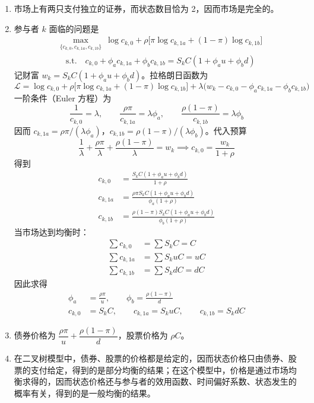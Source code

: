 \begin{solution}
\begin{enumerate}[label=(\alph*)]
    \item 市场上有两只支付独立的证券，而状态数目恰为 2，因而市场是完全的。
    \item 参与者 $k$ 面临的问题是
    \[
        \begin{aligned}
            &\max_{\{c_{k,0},c_{k,1a},c_{k,1b}\}}\ \log c_{k,0}+\rho\bigl[\pi\log c_{k,1a}+(1-\pi)\log c_{k,1b}\bigr]\\
            &\quad\text{s.t.}\quad c_{k,0}+\phi_{a}c_{k,1a}+\phi_{b}c_{k,1b}=S_{k}C(1+\phi_{a}u+\phi_{b}d)
        \end{aligned}
    \]
    记财富 $w_{k}=S_{k}C(1+\phi_{a}u+\phi_{b}d)$。拉格朗日函数为
    \[
        \mathcal{L}=\log c_{k,0}+\rho\bigl[\pi\log c_{k,1a}+(1-\pi)\log c_{k,1b}\bigr]+\lambda\bigl(w_{k}-c_{k,0}-\phi_{a}c_{k,1a}-\phi_{b}c_{k,1b}\bigr)
    \]
    一阶条件（Euler 方程）为
    \[
        \frac{1}{c_{k,0}}=\lambda,\qquad
        \frac{\rho\pi}{c_{k,1a}}=\lambda\phi_{a},\qquad
        \frac{\rho(1-\pi)}{c_{k,1b}}=\lambda\phi_{b}
    \]
    因而 $c_{k,1a}=\rho\pi/(\lambda\phi_{a})$，$c_{k,1b}=\rho(1-\pi)/(\lambda\phi_{b})$。代入预算
    \[
        \frac{1}{\lambda}+\frac{\rho\pi}{\lambda}+\frac{\rho(1-\pi)}{\lambda}=w_{k}\implies c_{k,0}=\frac{w_{k}}{1+\rho}
    \]
    得到
    \[
        \begin{aligned}
            c_{k,0}&=\frac{S_{k}C(1+\phi_{a}u+\phi_{b}d)}{1+\rho}\\
            c_{k,1a}&=\frac{\rho\pi S_{k}C(1+\phi_{a}u+\phi_{b}d)}{\phi_{a}(1+\rho)}\\
            c_{k,1b}&=\frac{\rho(1-\pi)S_{k}C(1+\phi_{a}u+\phi_{b}d)}{\phi_{b}(1+\rho)}
        \end{aligned}
    \]
    当市场达到均衡时：
    \[
        \begin{aligned}
            \sum c_{k,0}&=\sum S_{k}C=C\\
            \sum c_{k,1a}&=\sum S_{k}uC=uC\\
            \sum c_{k,1b}&=\sum S_{k}dC=dC
        \end{aligned}
    \]
    因此求得
    \[
        \begin{aligned}
            \phi_{a}&=\frac{\rho\pi}{u},\qquad\phi_{b}=\frac{\rho(1-\pi)}{d}\\
            c_{k,0}&=S_{k}C,\qquad c_{k,1a}=S_{k}uC,\qquad c_{k,1b}=S_{k}dC
        \end{aligned}
    \]
    \item 债券价格为 $\dfrac{\rho\pi}{u}+\dfrac{\rho(1-\pi)}{d}$，股票价格为 $\rho C$。
    \item 在二叉树模型中，债券、股票的价格都是给定的，因而状态价格只由债券、股票的支付给定，得到的是部分均衡的结果；在这个模型中，价格是通过市场均衡求得的，因而状态价格还与参与者的效用函数、时间偏好系数、状态发生的概率有关，得到的是一般均衡的结果。
\end{enumerate}
\end{solution}

